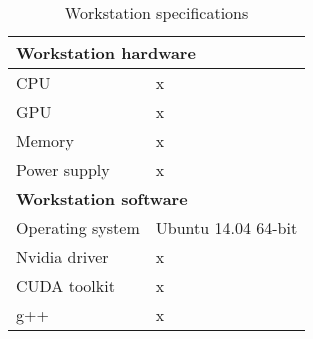 \begin{table}[h]
\begin{center}
\begin{tabular}{|l|l|}
\hline
\multicolumn{2}{|l|}{\textbf{Workstation hardware}} \\ \hline
 CPU & x \\ \hline
 GPU & x \\ \hline
 Memory & x \\ \hline
 Power supply & x \\ \hline
\multicolumn{2}{|l|}{\textbf{Workstation software}} \\ \hline
 Operating system & Ubuntu 14.04 64-bit \\ \hline
 Nvidia driver & x \\ \hline
 CUDA toolkit & x \\ \hline
 g++ & x \\ \hline
\end{tabular}
\end{center}
\label{tab:workstation}
\caption{Workstation specifications}
\end{table}
